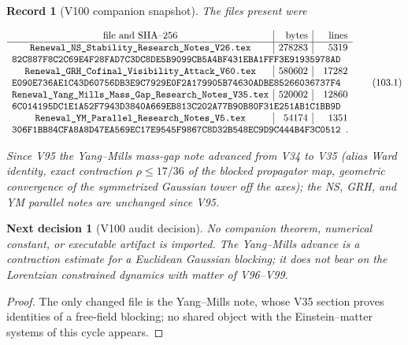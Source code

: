 \documentclass[11pt]{article}
\newtheorem{decision}[theorem]{Next decision}
\newtheorem{record}[theorem]{Record}
\theoremstyle{remark}
\begin{document}
\begin{record}[V100 companion snapshot]
\label{rec:v19v100-snapshot}
The files present were

\[
\begin{array}{c|r|r}
\hbox{file and SHA--256}&\hbox{bytes}&\hbox{lines}\\ \hline
\texttt{Renewal\_NS\_Stability\_Research\_Notes\_V26.tex}
&278283&5319\\
\multicolumn{3}{l}{
\texttt{82C887F8C2C69E4F28FAD7C3DC8DE5B9099CB5A4BF431EBA1FFF3E91935978AD}}
\\
\texttt{Renewal\_GRH\_Cofinal\_Visibility\_Attack\_V60.tex}
&580602&17282\\
\multicolumn{3}{l}{
\texttt{E090E736AE1C43D60756DB3E9C7929E0F2A179905B74630ADBE85266036737F4}}
\\
\texttt{Renewal\_Yang\_Mills\_Mass\_Gap\_Research\_Notes\_V35.tex}
&520002&12860\\
\multicolumn{3}{l}{
\texttt{6C014195DC1E1A52F7943D3840A669EB813C202A77B90B80F31E251AB1C1BB9D}}
\\
\texttt{Renewal\_YM\_Parallel\_Research\_Notes\_V5.tex}
&54174&1351\\
\multicolumn{3}{l}{
\texttt{306F1BB84CFA8A8D47EA569EC17E9545F9867C8D32B548EC9D9C444B4F3C0512}}.
\end{array}                                                     \tag{103.1}
\]

Since V95 the Yang--Mills mass-gap note advanced from V34 to V35
(alias Ward identity, exact contraction \(\rho\le17/36\) of the
blocked propagator map, geometric convergence of the symmetrized
Gaussian tower off the axes); the NS, GRH, and YM parallel notes are
unchanged since V95.
\end{record}

\begin{decision}[V100 audit decision]
\label{dec:v19v100-audit}
No companion theorem, numerical constant, or executable artifact is
imported.  The Yang--Mills advance is a contraction estimate for a
Euclidean Gaussian blocking; it does not bear on the Lorentzian
constrained dynamics with matter of V96--V99.
\end{decision}

\begin{proof}
The only changed file is the Yang--Mills note, whose V35 section
proves identities of a free-field blocking; no shared object with the
Einstein--matter systems of this cycle appears.
\end{proof}
\end{document}
